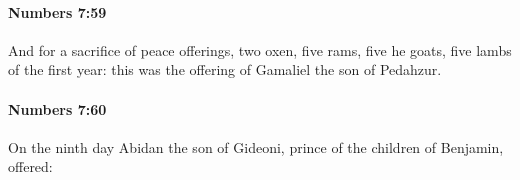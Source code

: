 		\paragraph{Numbers 7:59} %
			\label{NUMBERS-7-59}

			And for a sacrifice of peace offerings, two oxen, five rams, five he goats, five lambs of the first year: this was the offering of Gamaliel the son of Pedahzur.


		\paragraph{Numbers 7:60} %
			\label{NUMBERS-7-60}

			On the ninth day Abidan the son of Gideoni, prince of the children of Benjamin, offered:


